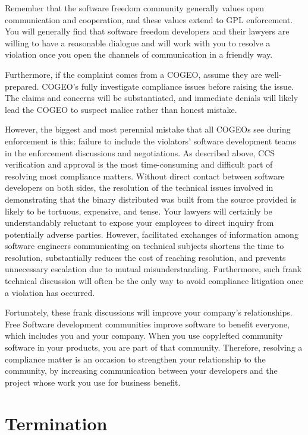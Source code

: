Remember that the software freedom community generally values open communication and
cooperation, and these values extend to GPL enforcement.  You will
generally find that software freedom developers and their lawyers are willing to
have a reasonable dialogue and will work with you to resolve a violation
once you open the channels of communication in a friendly way.

Furthermore, if the complaint comes from a COGEO, assume they are
well-prepared.  COGEO's fully investigate compliance issues before raising
the issue.  The claims and concerns will be substantiated, and immediate
denials will likely lead the COGEO to suspect malice rather than honest
mistake.

However, the biggest and most perennial mistake that all COGEOs see during
enforcement is this: failure to include the violators' software development
teams in the enforcement discussions and negotiations.  As described above,
CCS verification and approval is the most time-consuming and difficult part
of resolving most compliance matters.  Without direct contact between
software developers on both sides, the resolution of the technical issues
involved in demonstrating that the binary distributed was built from the
source provided is likely to be tortuous, expensive, and tense. Your lawyers
will certainly be understandably reluctant to expose your employees to direct
inquiry from potentially adverse parties.  However, facilitated exchanges of
information among software engineers communicating on technical subjects
shortens the time to resolution, substantially reduces the cost of reaching
resolution, and prevents unnecessary escalation due to mutual
misunderstanding.  Furthermore, such frank technical discussion will often be
the only way to avoid compliance litigation once a violation has occurred.

Fortunately, these frank discussions will improve your company's
relationships.  Free Software development communities improve software to
benefit everyone, which includes you and your company.  When you use
copylefted community software in your products, you are part of that
community.  Therefore, resolving a compliance matter is an occasion to
strengthen your relationship to the community, by increasing communication
between your developers and the project whose work you use for business
benefit.

\section{Termination}

